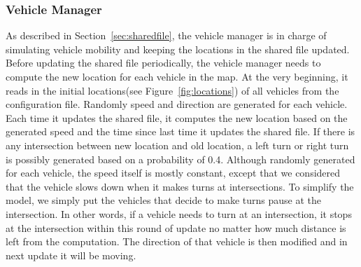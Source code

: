 \documentclass[twocolumn]{article}
\begin{document}
    \subsubsection{Vehicle Manager}
    \par{As described in Section~\ref{sec:sharedfile}, the vehicle manager is in charge of simulating vehicle mobility and keeping the locations in the shared file updated. Before updating the shared file periodically, the vehicle manager needs to compute the new location for each vehicle in the map. At the very beginning, it reads in the initial locations(see Figure~\ref{fig:locations}) of all vehicles from the configuration file. Randomly speed and direction are generated for each vehicle. Each time it updates the shared file, it computes the new location based on the generated speed and the time since last time it updates the shared file. If there is any intersection between new location and old location, a left turn or right turn is possibly generated based on a probability of 0.4. Although randomly generated for each vehicle, the speed itself is mostly constant, except that we considered that the vehicle slows down when it makes turns at intersections. To simplify the model, we simply put the vehicles that decide to make turns pause at the intersection. In other words, if a vehicle needs to turn at an intersection, it stops at the intersection within this round of update no matter how much distance is left from the computation. The direction of that vehicle is then modified and in next update it will be moving.}
\end{document}
